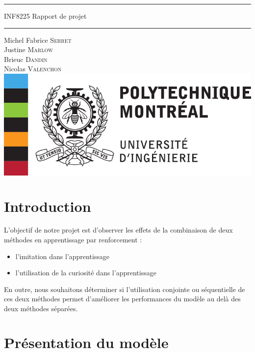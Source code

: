 \documentclass[a4paper,12pt]{report}
\begin{document}
\begin{titlepage}

  \begin{center}
  \vspace*{4cm}
    \rule{\linewidth}{0.5pt}
    \bigbreak
    {\Huge {INF8225} }
    \bigbreak
    {\LARGE {Rapport de projet}}
    \medbreak    
    \rule{\linewidth}{.5pt}
    \bigbreak
    Michel Fabrice \textsc{Serret}\\
    Justine \textsc{Marlow}\\
    Brieuc \textsc{Dandin}\\
    Nicolas \textsc{Valenchon}\\
    \vfill
	\includegraphics[scale=1]{Logo_Polytechnique_Montréal_(partenariat_Wikimédia).png}
	\vfill
    
\end{center}
\end{titlepage}

\section*{Introduction}
L'objectif de notre projet est d'observer les effets de la combinaison de deux méthodes en apprentissage par renforcement :
\begin{itemize}
    \item l'imitation dans l'apprentissage
    \item l'utilisation de la curiosité dans l'apprentissage
\end{itemize}
En outre, nous souhaitons déterminer si l'utilisation conjointe ou séquentielle de ces deux méthodes permet d'améliorer les performances du modèle au delà des deux méthodes séparées.

\section{Présentation du modèle}
\end{document}
